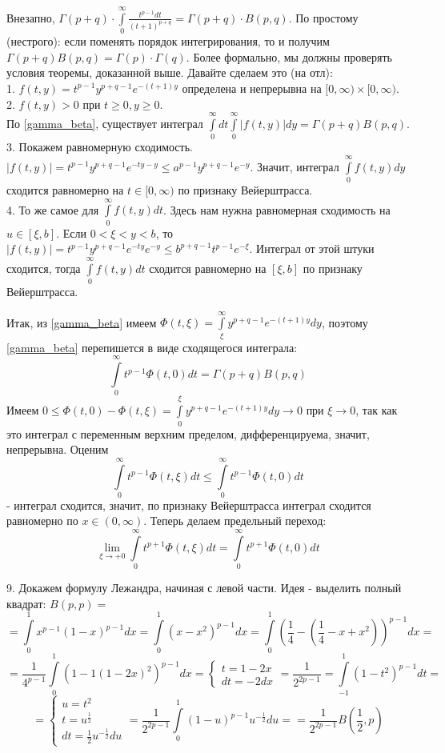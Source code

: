 Внезапно, 
$\Gamma(p+q)\cdot \int\limits_{0}^{\infty} \frac{t^{p-1}dt}{(t+1)^{p+q}}=
\Gamma(p+q)\cdot B(p,q)$. По простому (нестрого): если поменять 
порядок интегрирования, то и получим $\Gamma(p+q)B(p,q)=
\Gamma(p)\cdot \Gamma(q)$. Более формально, мы должны проверять условия 
теоремы, доказанной выше. Давайте сделаем это (на отл):\\
1. $f(t,y)=t^{p-1}y^{p+q-1}e^{-(t+1)y}$ определена и непрерывна на 
$[0,\infty)\times [0,\infty)$.\\
2. $f(t,y)>0$ при  $t\geqslant 0,y\geqslant 0$.\\
По \ref{gamma_beta}, существует интеграл $\int\limits_{0}^{\infty}
dt \int\limits_{0}^{\infty}|f(t,y)|dy=\Gamma(p+q)B(p,q)$.
3. Покажем равномерную сходимость. $|f(t,y)|=t^{p-1}y^{p+q-1}
e^{-ty-y}\leqslant a^{p-1}y^{p+q-1}e^{-y}$. Значит, интеграл 
$\int\limits_{0}^{\infty}f(t,y)dy$ сходится равномерно на $t\in [0,\infty)$
по признаку Вейерштрасса. \\
4. То же самое для $\int\limits_{0}^{\infty}f(t,y)dt$. Здесь
нам нужна равномерная сходимость на $u\in [\xi,b]$. Если 
$0<\xi<y<b$, то  $|f(t,y)|=t^{p-1}y^{p+q-1}e^{-ty}e^{-y}\leqslant 
b^{p+q-1}t^{p-1}e^{-\xi}$. Интеграл от этой штуки сходится, тогда
$\int\limits_{0}^{\infty}f(t,y)dt$ сходится равномерно на $[\xi,b]$ по 
признаку Вейерштрасса. 

Итак, из \ref{gamma_beta} имеем  $\Phi(t,\xi)=\int\limits_{\xi}^{\infty} 
y^{p+q-1}e^{-(t+1)y}dy$, поэтому \ref{gamma_beta} перепишется в виде
сходящегося интеграла:
$$\int\limits_{0}^{\infty}t^{p-1}\Phi(t,0)dt=\Gamma(p+q)B(p,q)$$ 
Имеем $0\leqslant \Phi(t,0)-\Phi(t,\xi)=
\int\limits_{0}^{\xi}y^{p+q-1}e^{-(t+1)y}dy\to 0$ при $\xi\to 0$,
так как это интеграл с переменным верхним пределом, дифференцируема, 
значит, непрерывна. Оценим
$$\int\limits_{0}^{\infty}t^{p-1}\Phi(t,\xi)dt\leqslant 
\int\limits_{0}^{\infty} t^{p-1}\Phi(t,0)dt$$
- интеграл сходится, значит, по признаку Вейерштрасса интеграл сходится
равномерно по $x \in (0,\infty)$. Теперь делаем предельный переход:
$$\lim\limits_{\xi \to +0}\int\limits_{0}^{\infty}t^{p+1}\Phi(t,\xi)dt
=\int\limits_{0}^{\infty}t^{p+1}\Phi(t,0)dt$$

9. Докажем формулу Лежандра, начиная с левой части. Идея - 
выделить полный квадрат: $B(p,p)=$
$$=\int\limits_{0}^{1}x^{p-1}(1-x)^{p-1}dx=\int\limits_{0}^{1}
(x-x^2)^{p-1}dx=\int\limits_{0}^{1}\left( \frac{1}{4}-
\left( \frac{1}{4}-x+x^2 \right) \right)^{p-1}dx=$$
$$=\frac{1}{4^{p-1}}\int\limits_{0}^{1} (1-1(1-2x)^2)^{p-1}dx=
\begin{cases}t=1-2x\\dt=-2dx\end{cases}=\frac{1}{2^{2p-1}}=
\int\limits_{-1}^{1} (1-t^2)^{p-1}dt=
$$
$$=\begin{cases}
    u=t^2\\t=u^{\frac{1}{2}}\\dt=\frac{1}{2}u^{-\frac{1}{2}}du\end{cases}=
    \frac{1}{2^{2p-1}}\int\limits_{0}^{1}(1-u)^{p-1}u^{-\frac{1}{2}}du=
=\frac{1}{2^{2p-1}}B(\frac{1}{2},p)$$ 



